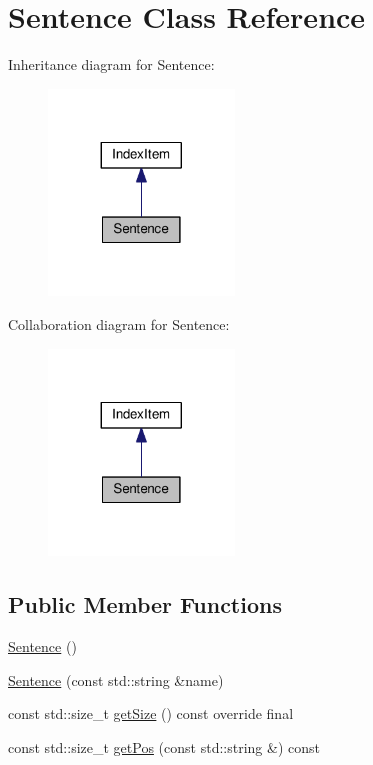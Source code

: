 \hypertarget{classSentence}{}\section{Sentence Class Reference}
\label{classSentence}


Inheritance diagram for Sentence\+:\nopagebreak
\begin{figure}[H]
\begin{center}
\leavevmode
\includegraphics[width=140pt]{classSentence__inherit__graph}
\end{center}
\end{figure}


Collaboration diagram for Sentence\+:\nopagebreak
\begin{figure}[H]
\begin{center}
\leavevmode
\includegraphics[width=140pt]{classSentence__coll__graph}
\end{center}
\end{figure}
\subsection*{Public Member Functions}
\begin{DoxyCompactItemize}
\item 
\hyperlink{classSentence_aa767c3de8aaf7f2e30fa7524cdfcaead}{Sentence} ()
\item 
\hyperlink{classSentence_a92557fe647ad458e02749286b71f2586}{Sentence} (const std\+::string \&name)
\item 
const std\+::size\+\_\+t \hyperlink{classSentence_a2f55ca4244f2ee9c1762019b37734330}{get\+Size} () const override final
\item 
const std\+::size\+\_\+t \hyperlink{classSentence_ab3d1877176dc98185753ee23a0897c1d}{get\+Pos} (const std\+::string \&) const
\end{DoxyCompactItemize}
